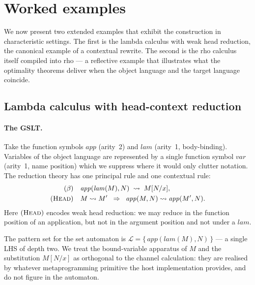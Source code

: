 \documentclass[11pt]{article}
\theoremstyle{plain}
\theoremstyle{definition}
\theoremstyle{remark}
\newcommand{\rew}{\leadsto}
\newcommand{\Lhs}{\mathcal{L}}
\begin{document}
\section{Worked examples}\label{sec:examples}

We now present two extended examples that exhibit the construction in
characteristic settings. The first is the lambda calculus with weak
head reduction, the canonical example of a contextual rewrite. The
second is the rho calculus itself compiled into rho --- a reflective
example that illustrates what the optimality theorems deliver when
the object language and the target language coincide.

\subsection{Lambda calculus with head-context reduction}\label{ssec:lambda}

\paragraph{The GSLT.}
Take the function symbols $\mathit{app}$ (arity~2) and $\mathit{lam}$
(arity~1, body-binding). Variables of the object language are
represented by a single function symbol $\mathit{var}$ (arity~1, name
position) which we suppress where it would only clutter notation. The
reduction theory has one principal rule and one contextual rule:
\begin{align*}
  (\beta) \quad
    & \mathit{app}(\mathit{lam}(M), N) \;\rew\; M[N/x], \\
  (\textsc{Head}) \quad
    & M \rew M' \;\;\Rightarrow\;\;
      \mathit{app}(M, N) \rew \mathit{app}(M', N).
\end{align*}
Here $(\textsc{Head})$ encodes weak head reduction: we may reduce in
the function position of an application, but not in the argument
position and not under a $\mathit{lam}$.

The pattern set for the set automaton is
$\Lhs = \{\,\mathit{app}(\mathit{lam}(M), N)\,\}$ --- a single LHS of
depth two. We treat the bound-variable apparatus of $M$ and the
substitution $M[N/x]$ as orthogonal to the channel calculation: they
are realised by whatever metaprogramming primitive the host
implementation provides, and do not figure in the automaton.
\end{document}
